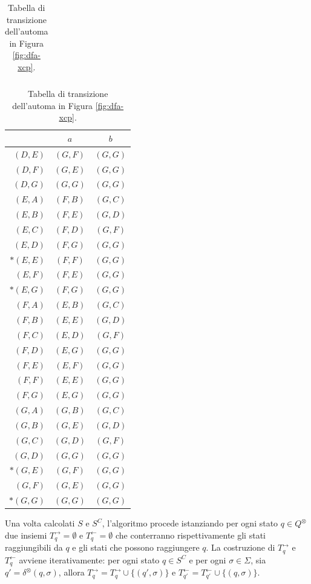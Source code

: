 \documentclass[a4paper,12pt,twoside,openright]{report}
\begin{document}
\begin{table}[!htb]
\begin{tabular}[t]{r|c|c}
  \end{tabular}
  \quad
  \begin{tabular}[t]{r|c|c}
    \toprule
              & $a$       & $b$       \\
    \midrule
    $(D, E)$  & $(G, F)$  & $(G, G)$  \\
    $(D, F)$  & $(G, E)$  & $(G, G)$  \\
    $(D, G)$  & $(G, G)$  & $(G, G)$  \\
    $(E, A)$  & $(F, B)$  & $(G, C)$  \\
    $(E, B)$  & $(F, E)$  & $(G, D)$  \\
    $(E, C)$  & $(F, D)$  & $(G, F)$  \\
    $(E, D)$  & $(F, G)$  & $(G, G)$  \\
    $*(E, E)$ & $(F, F)$  & $(G, G)$  \\
    $(E, F)$  & $(F, E)$  & $(G, G)$  \\
    $*(E, G)$ & $(F, G)$  & $(G, G)$  \\
    $(F, A)$  & $(E, B)$  & $(G, C)$  \\
    $(F, B)$  & $(E, E)$  & $(G, D)$  \\
    $(F, C)$  & $(E, D)$  & $(G, F)$  \\
    $(F, D)$  & $(E, G)$  & $(G, G)$  \\
    $(F, E)$  & $(E, F)$  & $(G, G)$  \\
    $(F, F)$  & $(E, E)$  & $(G, G)$  \\
    $(F, G)$  & $(E, G)$  & $(G, G)$  \\
    $(G, A)$  & $(G, B)$  & $(G, C)$  \\
    $(G, B)$  & $(G, E)$  & $(G, D)$  \\
    $(G, C)$  & $(G, D)$  & $(G, F)$  \\
    $(G, D)$  & $(G, G)$  & $(G, G)$  \\
    $*(G, E)$ & $(G, F)$  & $(G, G)$  \\
    $(G, F)$  & $(G, E)$  & $(G, G)$  \\
    $*(G, G)$ & $(G, G)$  & $(G, G)$  \\
    \bottomrule
  \end{tabular}
  \caption{\label{tab:dfa-xcp-transitions}Tabella di transizione dell'automa in Figura \ref{fig:dfa-xcp}.}
\end{table}

Una volta calcolati $S$ e $S^C$, l'algoritmo procede istanziando per ogni stato $q \in Q^\otimes$ due insiemi
$T^\rightarrow_q = \emptyset$ e $T^\leftarrow_q = \emptyset$ che conterranno rispettivamente gli stati raggiungibili
da $q$ e gli stati che possono raggiungere $q$. La costruzione di $T^\rightarrow_q$ e $T^\leftarrow_q$ avviene
iterativamente: per ogni stato $q \in S^C$ e per ogni $\sigma \in \Sigma$, sia $q' = \delta^\otimes(q, \sigma)$,
allora $T^\rightarrow_q = T^\rightarrow_q \cup \{ (q', \sigma) \}$ e 
$T^\leftarrow_{q'} = T^\leftarrow_{q'} \cup \{ (q, \sigma) \}$.
\end{document}
